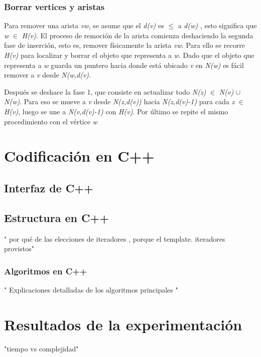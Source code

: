 \documentclass[a4paper,12pt]{article}
\begin{document}
\subsubsection{Borrar vertices y aristas}

Para remover una arista \textit{vw}, se asume que el \textit{d(v)} es ${\leq}$ a \textit{d(w)} , esto significa que  \textit{w} ${\in}$ \textit{H(v)}.
El proceso de remoci\'on de la arista comienza deshaciendo la segunda fase de inserci\'on, esto es, remover f\'isicamente la arista \textit{vw}. Para ello se recorre \textit{H(v)} para localizar y borrar el objeto que representa a \textit{w}. Dado que el objeto que representa a \textit{w} guarda un puntero hacia donde est\'a ubicado \textit{v} en \textit{N(w)} es f\'acil remover a \textit{v} desde \textit{N(w,d(v)}.


Despu\'es se deshace la fase 1, que consiste en actualizar  todo \textit{N(z)} ${\in}$ \textit{N(v)} ${\cup}$ \textit{N(w)}. Para eso se mueve a \textit{v} desde \textit{N(z,d(v))} hacia \textit{N(z,d(v)-1)} para cada \textit{z} ${\in}$ \textit{H(v)}, luego se une a  \textit{N(v,d(v)-1)} con \textit{H(v)}. Por \'ultimo se repite el mismo procedimiento con el v\'ertice \textit{w}


\section{Codificaci\'on en C++}
\label{sec4}

\subsection{Interfaz de C++}



\subsection{Estructura en C++}
" por qu\'e de las elecciones de iteradores , porque el template.
iteradores provistos"


\subsubsection{Algoritmos en C++}
" Explicaciones detalladas de los algoritmos principales "


\section{Resultados de la experimentaci\'on}
\label{sec5}
"tiempo vs complejidad"
\end{document}
